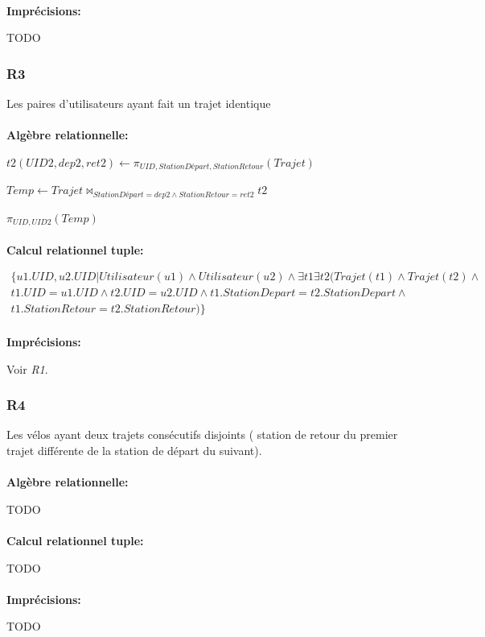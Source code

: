 \documentclass[a4paper, 12pt]{report}
\begin{document}
\paragraph{}
\textbf{Imprécisions:}

TODO%

\subsubsection*{R3}

Les paires d'utilisateurs ayant fait un trajet identique
\paragraph{}
\textbf{Algèbre relationnelle:}

$t2(UID2,dep2,ret2)\leftarrow\pi_{UID,StationDépart,StationRetour}(Trajet)$

$Temp\leftarrow Trajet\bowtie_{StationDépart=dep2\wedge StationRetour=ret2}t2$

$\pi_{UID,UID2}(Temp)$

\paragraph{}
\textbf{Calcul relationnel tuple:}

\begin{multline*}
\{  u1.UID, u2.UID |Utilisateur(u1)\wedge Utilisateur(u2)\wedge\exists t1\exists t2 ( Trajet(t1)\wedge Trajet(t2) \wedge \\
 t1.UID=u1.UID \wedge t2.UID=u2.UID \wedge t1.StationDepart=t2.StationDepart \wedge \\
 t1.StationRetour=t2.StationRetour )  \}
\end{multline*}

\paragraph{}
\textbf{Imprécisions:}

Voir \textit{R1}.

\subsubsection*{R4}

Les vélos ayant deux trajets consécutifs disjoints ( station de retour du premier trajet différente de la station de départ du suivant).
\paragraph{}
\textbf{Algèbre relationnelle:}

TODO %

\paragraph{}
\textbf{Calcul relationnel tuple:}

TODO %

\paragraph{}
\textbf{Imprécisions:}

TODO%
\end{document}
